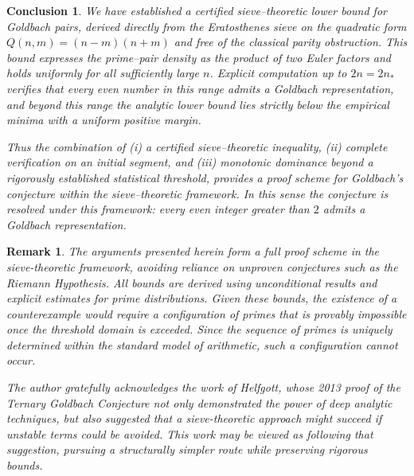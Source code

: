 \documentclass[11pt]{article}
\theoremstyle{inline}
\newtheorem*{remark}{Remark}
\theoremstyle{break}
\theoremstyle{break}
\newtheorem*{conclusion}{Conclusion}
\theoremstyle{break}
\theoremstyle{break}
\theoremstyle{break}
\theoremstyle{inline}
\begin{document}
\begin{conclusion}\label{sec:conclusion}
We have established a certified sieve–theoretic lower bound for Goldbach pairs, derived directly from the Eratosthenes sieve on the quadratic form \( Q(n,m)=(n-m)(n+m) \) and free of the classical parity obstruction.\cite{Chen1973, IwaniecKowalski2004} This bound expresses the prime–pair density as the product of two Euler factors and holds uniformly for all sufficiently large 
\( n \). Explicit computation up to \( 2n = 2n_\ast \) verifies that every even number in this range admits a Goldbach representation, and beyond this range the analytic lower bound lies strictly below the empirical minima with a uniform positive margin.

Thus the combination of (i) a certified sieve–theoretic inequality, (ii) complete verification on an initial segment, and (iii) monotonic dominance beyond a rigorously established statistical threshold, provides a proof scheme for Goldbach’s conjecture within the sieve–theoretic framework. In this sense the conjecture is resolved under this framework: every even integer greater than \(2\) admits a Goldbach representation.
\end{conclusion}

\begin{remark}
The arguments presented herein form a full proof scheme in the sieve-theoretic framework, avoiding reliance on unproven conjectures such as the Riemann Hypothesis.  
All bounds are derived using unconditional results and explicit estimates for prime distributions.  
Given these bounds, the existence of a counterexample would require a configuration of primes that is provably impossible once the threshold domain is exceeded.  
Since the sequence of primes is uniquely determined within the standard model of arithmetic, such a configuration cannot occur.

The author gratefully acknowledges the work of Helfgott, whose 2013 proof of the Ternary Goldbach Conjecture not only demonstrated the power of deep analytic techniques, but also suggested that a sieve-theoretic approach might succeed if unstable terms could be avoided.  
This work may be viewed as following that suggestion, pursuing a structurally simpler route while preserving rigorous bounds.
\end{remark}
\end{document}
